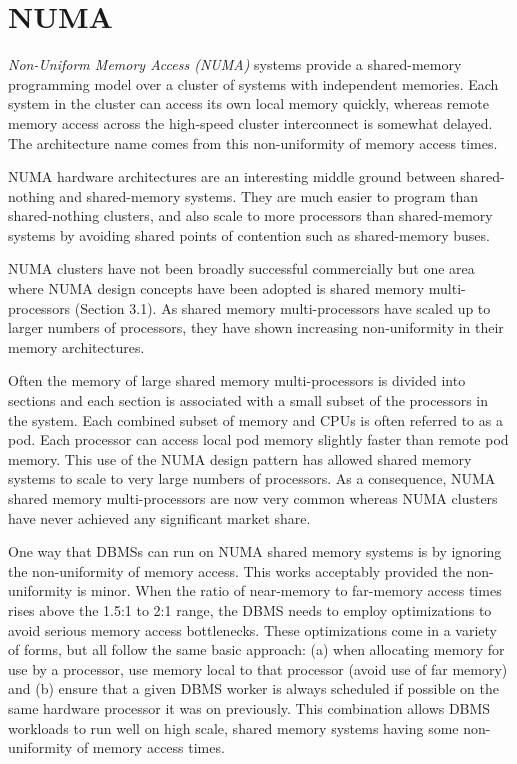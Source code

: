 \documentclass[b5paper,11pt,twoside,openright]{book}
\begin{document}
\hypertarget{numa}{%
\section{NUMA}\label{numa}}

\emph{Non-Uniform Memory Access (NUMA)} systems provide a shared-memory
programming model over a cluster of systems with independent memories.
Each system in the cluster can access its own local memory quickly,
whereas remote memory access across the high-speed cluster interconnect
is somewhat delayed. The architecture name comes from this
non-uniformity of memory access times.

NUMA hardware architectures are an interesting middle ground between
shared-nothing and shared-memory systems. They are much easier to
program than shared-nothing clusters, and also scale to more processors
than shared-memory systems by avoiding shared points of contention such
as shared-memory buses.

NUMA clusters have not been broadly successful commercially but one area
where NUMA design concepts have been adopted is shared memory
multi-processors (Section 3.1). As shared memory multi-processors have
scaled up to larger numbers of processors, they have shown increasing
non-uniformity in their memory architectures.

Often the memory of large shared memory multi-processors is divided into
sections and each section is associated with a small subset of the
processors in the system. Each combined subset of memory and CPUs is
often referred to as a pod. Each processor can access local pod memory
slightly faster than remote pod memory. This use of the NUMA design
pattern has allowed shared memory systems to scale to very large numbers
of processors. As a consequence, NUMA shared memory multi-processors are
now very common whereas NUMA clusters have never achieved any
significant market share.

One way that DBMSs can run on NUMA shared memory systems is by ignoring
the non-uniformity of memory access. This works acceptably provided the
non-uniformity is minor. When the ratio of near-memory to far-memory
access times rises above the 1.5:1 to 2:1 range, the DBMS needs to
employ optimizations to avoid serious memory access bottlenecks. These
optimizations come in a variety of forms, but all follow the same basic
approach: (a) when allocating memory for use by a processor, use memory
local to that processor (avoid use of far memory) and (b) ensure that a
given DBMS worker is always scheduled if possible on the same hardware
processor it was on previously. This combination allows DBMS workloads
to run well on high scale, shared memory systems having some
non-uniformity of memory access times.
\end{document}
